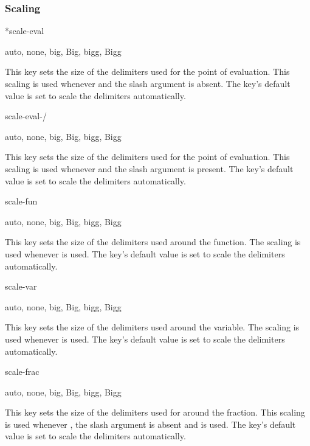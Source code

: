 	\clearpage
	
	\subsubsection*{Scaling}
	
	\begin{option}*{scale-eval}
		\begin{values}[default = auto]
			auto, none, big, Big, bigg, Bigg
		\end{values}
		This key sets the size of the delimiters used for the point of evaluation. This scaling is used whenever  and the slash argument is absent. The key's default value is set to scale the delimiters automatically.
	\end{option}
	
	\begin{option}{scale-eval-/}
		\begin{values}[default = auto]
			auto, none, big, Big, bigg, Bigg
		\end{values}
		This key sets the size of the delimiters used for the point of evaluation. This scaling is used whenever  and the slash argument is present. The key's default value is set to scale the delimiters automatically.
	\end{option}
	
	\begin{option}{scale-fun}
		\begin{values}[default = auto]
			auto, none, big, Big, bigg, Bigg
		\end{values}
		This key sets the size of the delimiters used around the function. The scaling is used whenever  is used. The key's default value is set to scale the delimiters automatically.
	\end{option}
	
	\begin{option}{scale-var}
		\begin{values}[default = auto]
			auto, none, big, Big, bigg, Bigg
		\end{values}
		This key sets the size of the delimiters used around the variable. The scaling is used whenever  is used. The key's default value is set to scale the delimiters automatically.
	\end{option}
	
	\begin{option}{scale-frac}
		\begin{values}[default = auto]
			auto, none, big, Big, bigg, Bigg
		\end{values}
		This key sets the size of the delimiters used for around the fraction. This scaling is used whenever , the slash argument is absent and  is used. The key's default value is set to scale the delimiters automatically.
	\end{option}
	
